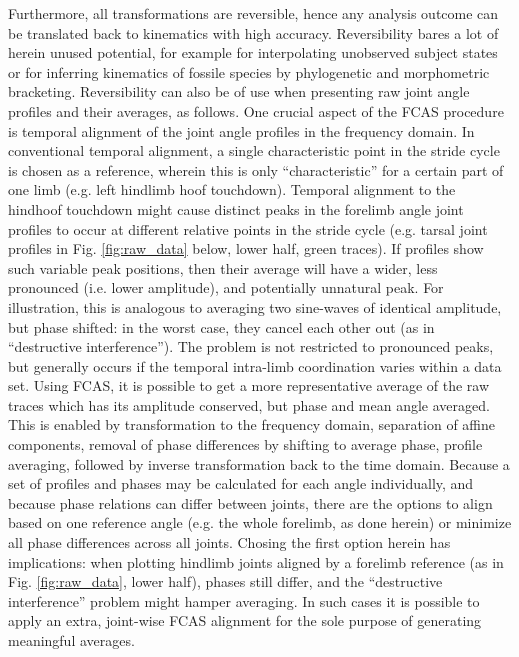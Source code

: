 Furthermore, all transformations are reversible, hence any analysis outcome can be translated back to kinematics with high accuracy.
Reversibility bares a lot of herein unused potential, for example for interpolating unobserved subject states or for inferring kinematics of fossile species by phylogenetic and morphometric bracketing.
Reversibility can also be of use when presenting raw joint angle profiles and their averages, as follows.
One crucial aspect of the FCAS procedure is temporal alignment of the joint angle profiles in the frequency domain.
In conventional temporal alignment, a single characteristic point in the stride cycle is chosen as a reference, wherein this is only ``characteristic'' for a certain part of one limb (e.g. left hindlimb hoof touchdown).
Temporal alignment to the hindhoof touchdown might cause distinct peaks in the forelimb angle joint profiles to occur at different relative points in the stride cycle (e.g. tarsal joint profiles in Fig. \ref{fig:raw_data} below, lower half, green traces).
If profiles show such variable peak positions, then their average will have a wider, less pronounced (i.e. lower amplitude), and potentially unnatural peak.
For illustration, this is analogous to averaging two sine-waves of identical amplitude, but phase shifted: in the worst case, they cancel each other out (as in ``destructive interference'').
The problem is not restricted to pronounced peaks, but generally occurs if the temporal intra-limb coordination varies within a data set.
Using FCAS, it is possible to get a more representative average of the raw traces which has its amplitude conserved, but phase and mean angle averaged.
This is enabled by transformation to the frequency domain, separation of affine components, removal of phase differences by shifting to average phase, profile averaging, followed by inverse transformation back to the time domain.
Because a set of profiles and phases may be calculated for each angle individually, and because phase relations can differ between joints, there are the options to align based on one reference angle (e.g. the whole forelimb, as done herein) or minimize all phase differences across all joints.
Chosing the first option herein has implications: when plotting hindlimb joints aligned by a forelimb reference (as in Fig. \ref{fig:raw_data}, lower half), phases still differ, and the ``destructive interference'' problem might hamper averaging.
In such cases it is possible to apply an extra, joint-wise FCAS alignment for the sole purpose of generating meaningful averages.



